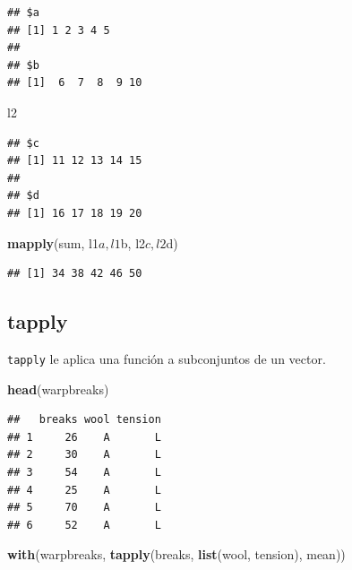 \documentclass[]{article}
\newenvironment{Shaded}{\begin{snugshade}}{\end{snugshade}}
\newcommand{\KeywordTok}[1]{\textcolor[rgb]{0.13,0.29,0.53}{\textbf{{#1}}}}
\newcommand{\NormalTok}[1]{{#1}}
\begin{document}
\begin{verbatim}
## $a
## [1] 1 2 3 4 5
## 
## $b
## [1]  6  7  8  9 10
\end{verbatim}

\begin{Shaded}
\begin{Highlighting}[]
\NormalTok{l2}
\end{Highlighting}
\end{Shaded}

\begin{verbatim}
## $c
## [1] 11 12 13 14 15
## 
## $d
## [1] 16 17 18 19 20
\end{verbatim}

\begin{Shaded}
\begin{Highlighting}[]
\KeywordTok{mapply}\NormalTok{(sum, l1$a, l1$b, l2$c, l2$d)}
\end{Highlighting}
\end{Shaded}

\begin{verbatim}
## [1] 34 38 42 46 50
\end{verbatim}

\subsection{tapply}\label{tapply}

\texttt{tapply} le aplica una función a subconjuntos de un vector.

\begin{Shaded}
\begin{Highlighting}[]
\KeywordTok{head}\NormalTok{(warpbreaks)}
\end{Highlighting}
\end{Shaded}

\begin{verbatim}
##   breaks wool tension
## 1     26    A       L
## 2     30    A       L
## 3     54    A       L
## 4     25    A       L
## 5     70    A       L
## 6     52    A       L
\end{verbatim}

\begin{Shaded}
\begin{Highlighting}[]
\KeywordTok{with}\NormalTok{(warpbreaks, }\KeywordTok{tapply}\NormalTok{(breaks, }\KeywordTok{list}\NormalTok{(wool, tension), mean))}
\end{Highlighting}
\end{Shaded}
\end{document}
